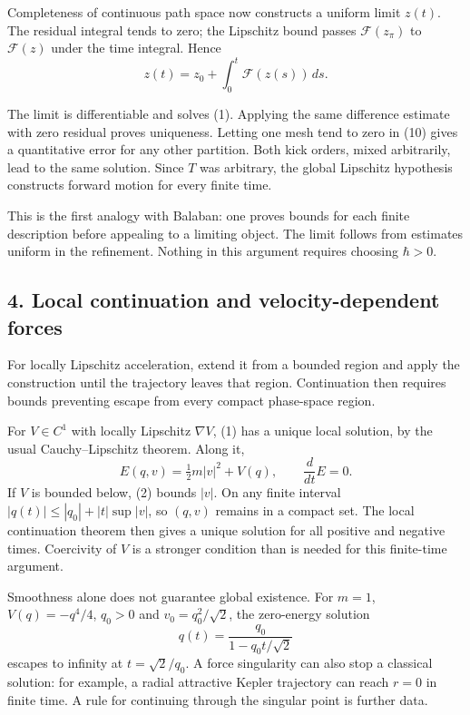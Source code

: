 \documentclass[11pt,a4paper]{article}
\begin{document}
Completeness of continuous path space now constructs a uniform limit
\(z(t)\). The residual integral tends to zero; the Lipschitz bound
passes \(\mathcal F(z_\pi)\) to \(\mathcal F(z)\) under the time
integral. Hence \[z(t)=z_0+\int_0^t\mathcal F(z(s))\,ds.\tag{11}\]

The limit is differentiable and solves (1). Applying the same difference
estimate with zero residual proves uniqueness. Letting one mesh tend to
zero in (10) gives a quantitative error for any other partition. Both
kick orders, mixed arbitrarily, lead to the same solution. Since \(T\)
was arbitrary, the global Lipschitz hypothesis constructs forward motion
for every finite time.

This is the first analogy with Balaban: one proves bounds for each
finite description before appealing to a limiting object. The limit
follows from estimates uniform in the refinement. Nothing in this
argument requires choosing \(\hbar>0\).

\subsection{4. Local continuation and velocity-dependent
forces}\label{local-continuation-and-velocity-dependent-forces}

For locally Lipschitz acceleration, extend it from a bounded region and
apply the construction until the trajectory leaves that region.
Continuation then requires bounds preventing escape from every compact
phase-space region.

For \(V\in C^1\) with locally Lipschitz \(\nabla V\), (1) has a unique
local solution, by the usual Cauchy--Lipschitz theorem. Along it,
\[E(q,v)=\tfrac12m|v|^2+V(q),\qquad \frac d{dt}E=0.\] If \(V\) is
bounded below, (2) bounds \(|v|\). On any finite interval
\(|q(t)|\le |q_0|+|t|\sup|v|\), so \((q,v)\) remains in a compact set.
The local continuation theorem then gives a unique solution for all
positive and negative times. Coercivity of \(V\) is a stronger condition
than is needed for this finite-time argument.

Smoothness alone does not guarantee global existence. For \(m=1\),
\(V(q)=-q^4/4\), \(q_0>0\) and \(v_0=q_0^2/\sqrt2\), the zero-energy
solution \[q(t)=\frac{q_0}{1-q_0t/\sqrt2}\] escapes to infinity at
\(t=\sqrt2/q_0\). A force singularity can also stop a classical
solution: for example, a radial attractive Kepler trajectory can reach
\(r=0\) in finite time. A rule for continuing through the singular point
is further data.
\end{document}
